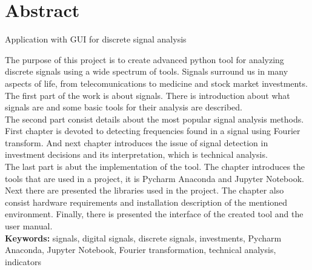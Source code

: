 \chapter*{Abstract}
\centerline{Application with GUI for discrete signal analysis}
\vspace{0.5cm}
\indent The purpose of this project is to create advanced python tool for analyzing discrete signals using a wide spectrum of tools. Signals surround us in many aspects of life, from telecomunications to medicine and stock market investments. \\
\indent The first part of the work is about signals. There is introduction about what signals are and some basic tools for their analysis are described. \\
\indent The second part consist details about the most popular signal analysis methods. First chapter is devoted to detecting frequencies found in a signal using Fourier transform. And next chapter introduces the issue of signal detection in investment decisions and its interpretation, which is technical analysis. \\
\indent  The last part is abut the implementation of the tool. The chapter introduces the tools that are used in a project, it is Pycharm Anaconda and Jupyter Notebook. Next there are presented the libraries used in the project. The chapter also consist hardware requirements and installation description of the mentioned environment. Finally, there is presented the interface of the created tool and the user manual.\\
\vspace{0.5cm}\newline
\textbf{Keywords:} signals, digital signals, discrete signals, investments, Pycharm Anaconda, Jupyter Notebook, Fourier transformation, technical analysis, indicators \vspace{0.5cm}